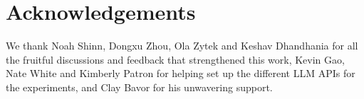 
\section*{Acknowledgements}
We thank Noah Shinn, Dongxu Zhou, Ola Zytek and Keshav Dhandhania for all the fruitful discussions and feedback that strengthened this work, Kevin Gao, Nate White and Kimberly Patron for helping set up the different LLM APIs for the experiments, and Clay Bavor for his unwavering support.
